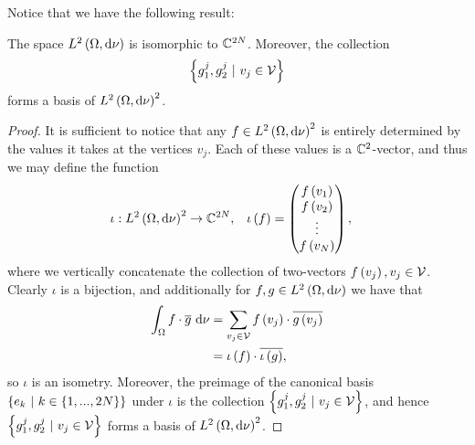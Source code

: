 Notice that we have the following result:
\begin{lemma}
	The space $L^{2}\left( \Omega,\mathrm{d}\nu \right)$ is isomorphic to $\mathbb{C}^{2N}$.
	Moreover, the collection 
	\begin{align*}
		\left\{ g_1^j, g_2^j \ \vert \ v_j\in\mathcal{V} \right\}
	\end{align*}
	forms a basis of $L^{2}\left( \Omega,\mathrm{d}\nu \right)^2$.
\end{lemma}
\begin{proof}
	It is sufficient to notice that any $f\in L^{2}\left( \Omega,\mathrm{d}\nu \right)^2$ is entirely determined by the values it takes at the vertices $v_j$.
	Each of these values is a $\mathbb{C}^2$-vector, and thus we may define the function
	\begin{align*}
		\iota:L^{2}\left( \Omega,\mathrm{d}\nu \right)^2 \rightarrow\mathbb{C}^{2N}, &\quad
		\iota\left( f \right) = \begin{pmatrix} f\left( v_1 \right) \\ f\left( v_2 \right) \\ \vdots \\ f\left( v_N \right) \end{pmatrix},
	\end{align*}
	where we vertically concatenate the collection of two-vectors $f\left( v_j \right), v_j\in\mathcal{V}$.
	Clearly $\iota$ is a bijection, and additionally for $f,g\in L^{2}\left( \Omega,\mathrm{d}\nu \right)$ we have that
	\begin{align*}
		\int_{\Omega}f\cdot \overline{g} \ \mathrm{d}\nu &= \sum_{v_j\in\mathcal{V}} f\left( v_j \right)\cdot\overline{g\left( v_j \right)} \\
		&= \iota\left( f \right)\cdot\overline{\iota\left( g \right)},
	\end{align*}
	so $\iota$ is an isometry.
	Moreover, the preimage of the canonical basis $\clbracs{e_k \ \vert \ k\in\clbracs{1,...,2N}}$ under $\iota$ is the collection $\clbracs{g_1^j, g_2^j \ \vert \ v_j\in\vertSet}$, and hence $\clbracs{g_1^j, g_2^j \ \vert \ v_j\in\vertSet}$ forms a basis of $L^{2}\left( \Omega,\mathrm{d}\nu \right)^2$.
\end{proof}

